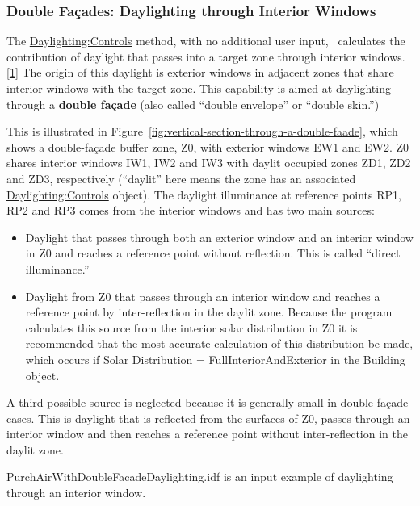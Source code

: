\subsubsection{Double Façades: Daylighting through Interior Windows}\label{double-fauxe7ades-daylighting-through-interior-windows}

The \hyperref[daylightingcontrols-000]{Daylighting:Controls} method, with no additional user input,~ calculates the contribution of daylight that passes into a target zone through interior windows.\protect\hyperlink{ux5fftn1}{{[}1{]}} The origin of this daylight is exterior windows in adjacent zones that share interior windows with the target zone. This capability is aimed at daylighting through a \textbf{double façade} (also called ``double envelope'' or ``double skin.'')

This is illustrated in Figure~\ref{fig:vertical-section-through-a-double-faade}, which shows a double-façade buffer zone, Z0, with exterior windows EW1 and EW2. Z0 shares interior windows IW1, IW2 and IW3 with daylit occupied zones ZD1, ZD2 and ZD3, respectively (``daylit'' here means the zone has an associated \hyperref[daylightingcontrols-000]{Daylighting:Controls} object). The daylight illuminance at reference points RP1, RP2 and RP3 comes from the interior windows and has two main sources:

\begin{itemize}
  \item
    Daylight that passes through both an exterior window and an interior window in Z0 and reaches a reference point without reflection. This is called ``direct illuminance.''
  \item
    Daylight from Z0 that passes through an interior window and reaches a reference point by inter-reflection in the daylit zone. Because the program calculates this source from the interior solar distribution in Z0 it is recommended that the most accurate calculation of this distribution be made, which occurs if Solar Distribution = FullInteriorAndExterior in the Building object.
\end{itemize}

A third possible source is neglected because it is generally small in double-façade cases. This is daylight that is reflected from the surfaces of Z0, passes through an interior window and then reaches a reference point without inter-reflection in the daylit zone.

PurchAirWithDoubleFacadeDaylighting.idf is an input example of daylighting through an interior window.

